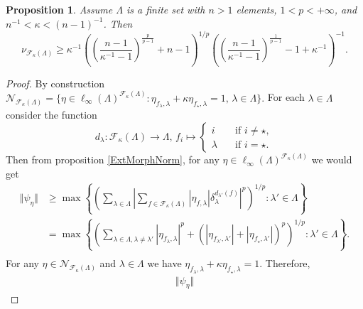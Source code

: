 \documentclass[12pt]{article}
\newtheorem{proposition}[theorem]{Proposition}
\begin{document}
\begin{proposition}\label{ExtMorphsNormLwrBnd}
    Assume $\Lambda$ is a finite set with $n > 1$ elements, $1 < p < +\infty$, 
    and $n^{-1} < \kappa < (n-1)^{-1}$. Then
    \[
        \nu_{\mathcal{F}_{\kappa}(\Lambda)}
        \geq 
        \kappa^{-1}
        \left(
            \left(\frac{n-1}{\kappa^{-1}-1}\right)^{\frac{p}{p-1}}+n-1
        \right)^{1/p}
        \left(
            \left(\frac{n-1}{\kappa^{-1}-1}\right)^{\frac{1}{p-1}}-1+\kappa^{-1}
        \right)^{-1}.
    \]
\end{proposition}
\begin{proof}
    By construction
    $
        \mathcal{N}_{\mathcal{F}_{\kappa}(\Lambda)}=\{
            \eta\in\ell_\infty(\Lambda)^{\mathcal{F}_{\kappa}(\Lambda)}:
            \eta_{f_\lambda,\lambda}+\kappa \eta_{f_\star, \lambda}=1,\, 
            \lambda\in\Lambda
        \}.
    $
    For each $\lambda\in\Lambda$ consider the function
    \[
        d_\lambda:\mathcal{F}_\kappa(\Lambda)\to\Lambda,\,
        f_i\mapsto
        \begin{cases}
            i\quad &\text{if } i\neq \star,\\
            \lambda\quad &\text{if } i=\star.
        \end{cases}
    \]
    Then from proposition \ref{ExtMorphNorm}, for 
    any $\eta\in\ell_\infty(\Lambda)^{\mathcal{F}_{\kappa}(\Lambda)}$ we 
    would get
    \[
    \begin{aligned}
        \Vert\psi_{\eta}\Vert
        &\geq\max\left\{
            \left(\sum_{\lambda\in\Lambda}
                \left|
                    \sum_{f\in\mathcal{F}_{\kappa}(\Lambda)} 
                        |\eta_{f,\lambda}|\delta_{\lambda}^{d_{\lambda'}(f)}
                \right|^p
            \right)^{1/p}:
            \lambda'\in\Lambda
        \right\} \\
        &=\max\left\{
            \left(
                \sum_{\lambda\in\Lambda,\lambda\neq \lambda'} 
                    |\eta_{f_\lambda,\lambda}|^p+
                    (|\eta_{f_{\lambda'},\lambda'}|+|\eta_{f_\star,\lambda'}|)^p
            \right)^{1/p}:
            \lambda'\in\Lambda
        \right\}. \\
    \end{aligned}
    \]
    For any $\eta\in\mathcal{N}_{\mathcal{F}_{\kappa}(\Lambda)}$ 
    and $\lambda\in\Lambda$ we 
    have $\eta_{f_\lambda,\lambda}+\kappa \eta_{f_\star, \lambda}=1$. 
    Therefore,
    \[
    \begin{aligned}
        \Vert \psi_{\eta}\Vert

\end{aligned}\]
\end{proof}
\end{document}
